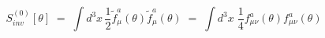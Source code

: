 \begin{equation}\label{eq:mxwll}
S^{(0)}_{inv} [\theta]\;=\; \int d^3x\, \frac{1}{2} {\tilde f}_\mu^a(\theta)
{\tilde f}_\mu^a(\theta) \;=\; \int d^3x \;\frac{1}{4} f^a_{\mu\nu}(\theta) f^a_{\mu\nu}(\theta)
\end{equation}

